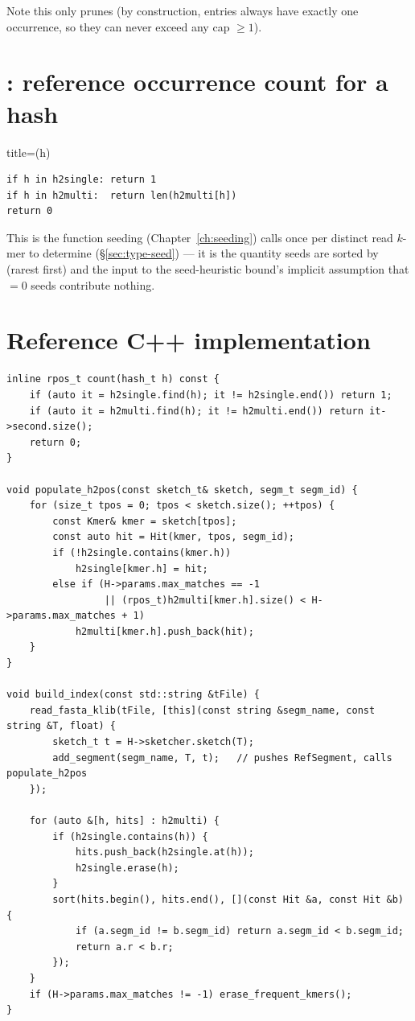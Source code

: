 Note this only prunes  (by construction,  entries always have exactly
one occurrence, so they can never exceed any cap $\ge 1$).

\section{: reference occurrence count for a hash}
\label{sec:index-count}

\begin{algobox}{title={(h)}}
\begin{verbatim}
if h in h2single: return 1
if h in h2multi:  return len(h2multi[h])
return 0
\end{verbatim}
\end{algobox}

This is the function seeding (Chapter~\ref{ch:seeding}) calls once per distinct read $k$-mer to
determine  (\S\ref{sec:type-seed}) --- it is the quantity seeds are sorted by
(rarest first) and the input to the seed-heuristic bound's implicit assumption that
$=0$ seeds contribute nothing.

\section{Reference C++ implementation}

\begin{lstlisting}[style=cppstyle,caption={Core of \code{SketchIndex}, \texttt{src/index.h}}]
inline rpos_t count(hash_t h) const {
    if (auto it = h2single.find(h); it != h2single.end()) return 1;
    if (auto it = h2multi.find(h); it != h2multi.end()) return it->second.size();
    return 0;
}

void populate_h2pos(const sketch_t& sketch, segm_t segm_id) {
    for (size_t tpos = 0; tpos < sketch.size(); ++tpos) {
        const Kmer& kmer = sketch[tpos];
        const auto hit = Hit(kmer, tpos, segm_id);
        if (!h2single.contains(kmer.h))
            h2single[kmer.h] = hit;
        else if (H->params.max_matches == -1
                 || (rpos_t)h2multi[kmer.h].size() < H->params.max_matches + 1)
            h2multi[kmer.h].push_back(hit);
    }
}

void build_index(const std::string &tFile) {
    read_fasta_klib(tFile, [this](const string &segm_name, const string &T, float) {
        sketch_t t = H->sketcher.sketch(T);
        add_segment(segm_name, T, t);   // pushes RefSegment, calls populate_h2pos
    });

    for (auto &[h, hits] : h2multi) {
        if (h2single.contains(h)) {
            hits.push_back(h2single.at(h));
            h2single.erase(h);
        }
        sort(hits.begin(), hits.end(), [](const Hit &a, const Hit &b) {
            if (a.segm_id != b.segm_id) return a.segm_id < b.segm_id;
            return a.r < b.r;
        });
    }
    if (H->params.max_matches != -1) erase_frequent_kmers();
}
\end{lstlisting}

